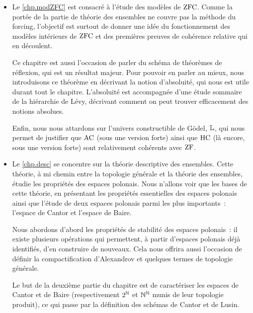 \begin{itemize}
  Une fois la notion de club introduite, les questions d'intérêt du chapitre
  sont de chercher à quel point le filtre des clubs est stable par des
  intersections de grandes familles et combien on peut construire d'ensembles
  stationnaires disjoints. L'étude de ces questions est l'occasion d'introduire
  le lemme de Fodor sur les fonctions régressives.

  Nous voyons pour finir le chapitre une application du lemme de Fodor à
  un point important du \cref{chp.ordinaux}~: la détermination de
  l'exponentielle cardinale. Plus précisément, nous y voyons une démonstration
  combinatoire du théorème de Silver, décrivant le comportement de la
  fonction $\varCk\mapsto 2^{\varCk}$ pour des cardinaux singuliers.
  
\item Le \cref{chp.modZFC} est consacré à l'étude des modèles de $\operatorname{ZFC}$. Comme
  la portée de la partie de théorie des ensembles ne couvre pas la méthode du
  forcing, l'objectif est surtout de donner une idée du fonctionnement des
  modèles intérieurs de $\operatorname{ZFC}$ et des premières preuves de cohérence relative
  qui en découlent.

  Ce chapitre est aussi l'occasion de parler du schéma de théorèmes de
  réflexion, qui est un résultat majeur. Pour pouvoir en parler au mieux, nous
  introduisons ce théorème en décrivant la notion d'absoluité, qui nous est
  utile durant tout le chapitre. L'absoluité est accompagnée d'une étude
  sommaire de la hiérarchie de Lévy, décrivant comment on peut trouver
  efficacement des notions absolues.

  Enfin, nous nous attardons sur l'univers constructible de Gödel, $\mathbb L$,
  qui nous permet de justifier que $\operatorname{AC}$ (sous une version forte) ainsi que
  $\operatorname{HC}$ (là encore, sous une version forte) sont relativement cohérents avec
  $\operatorname{ZF}$.
  
\item Le \cref{chp.desc} se concentre sur la théorie descriptive des ensembles.
  Cette théorie, à mi chemin entre la topologie générale et la théorie des
  ensembles, étudie les propriétés des espaces polonais. Nous n'allons voir que
  les bases de cette théorie, en présentant les propriétés essentielles des
  espaces polonais ainsi que l'étude de deux espaces polonais parmi les plus
  importants~: l'espace de Cantor et l'espace de Baire.

  Nous abordons d'abord les propriétés de stabilité des espaces polonais~: il
  existe plusieurs opérations qui permettent, à partir d'espaces polonais déjà
  identifiés, d'en construire de nouveaux. Cela nous offrira aussi l'occasion
  de définir la compactification d'Alexandrov et quelques termes de
  topologie générale.

  Le but de la deuxième partie du chapitre est de caractériser les espaces de
  Cantor et de Baire (respectivement $2^\mathbb N$ et $\mathbb N^\mathbb N$ munis de
  leur topologie produit), ce qui passe par la définition des schémas de
  Cantor et de Lusin.
\end{itemize}

